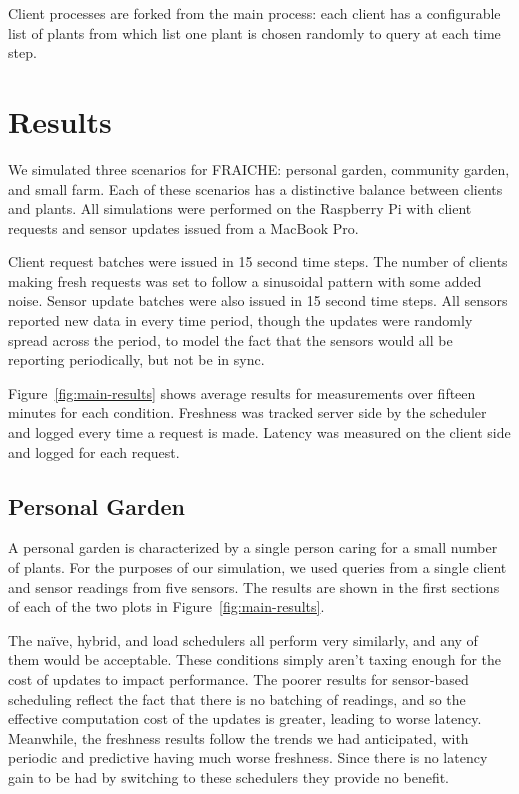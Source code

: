 \documentclass[a4paper]{acm_proc_article-sp}
\makeatletter
\newcommand{\naive}{na\"{i}ve\@\xspace}
\makeatother
\begin{document}
Client processes are forked from the main process: each client has a configurable list of plants from which list one plant is chosen randomly to query at each time step.  

\section{Results}

We simulated three scenarios for FRAICHE: personal garden, community garden, and small farm.  Each of these scenarios has a distinctive balance between clients and plants.  All simulations were performed on the Raspberry Pi with client requests and sensor updates issued from a MacBook Pro.

Client request batches were issued in 15 second time steps.  The number of clients making fresh requests was set to follow a sinusoidal pattern with some added noise.  Sensor update batches were also issued in 15 second time steps.  All sensors reported new data in every time period, though the updates were randomly spread across the period, to model the fact that the sensors would all be reporting periodically, but not be in sync.

Figure~\ref{fig:main-results} shows average results for measurements over fifteen minutes for each condition.  Freshness was tracked server side by the scheduler and logged every time a request is made.  Latency was measured on the client side and logged for each request.

\subsection{Personal Garden}

A personal garden is characterized by a single person caring for a small number of plants.  For the purposes of our simulation, we used queries from a single client and sensor readings from five sensors.  The results are shown in the first sections of each of the two plots in Figure~\ref{fig:main-results}.

The \naive, hybrid, and load schedulers all perform very similarly, and any of them would be acceptable.  These conditions simply aren't taxing enough for the cost of updates to impact performance.  The poorer results for sensor-based scheduling reflect the fact that there is no batching of readings, and so the effective computation cost of the updates is greater, leading to worse latency.  Meanwhile, the freshness results follow the trends we had anticipated, with periodic and predictive having much worse freshness.  Since there is no latency gain to be had by switching to these schedulers they provide no benefit.
\end{document}
